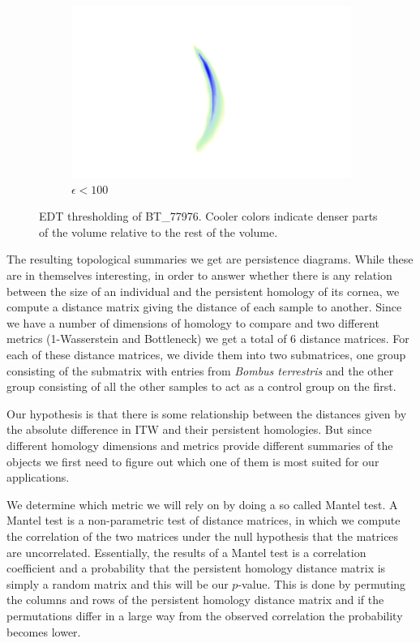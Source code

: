 \begin{figure}[ht]
\begin{subfigure}{.3 \linewidth}
  \includegraphics[scale=0.2]{eps100.png}
  \caption{$\epsilon < 100$}
  \end{subfigure}
  \caption{\label{thresh} EDT thresholding of BT\_77976. Cooler colors indicate denser parts of the volume relative to the rest of the volume.}
\end{figure}

The resulting topological summaries we get are persistence diagrams. While these are in themselves interesting, in order to answer whether there is any relation between the size of an individual and the persistent homology of its cornea, we compute a distance matrix giving the distance of each sample to another. Since we have a number of dimensions of homology to compare and two different metrics (1-Wasserstein and Bottleneck) we get a total of 6 distance matrices. For each of these distance matrices, we divide them into two submatrices, one group consisting of the submatrix with entries from \textit{Bombus terrestris} and the other group consisting of all the other samples to act as a control group on the first.

Our hypothesis is that there is some relationship between the distances given by the absolute difference in ITW and their persistent homologies. But since different homology dimensions and metrics provide different summaries of the objects we first need to figure out which one of them is most suited for our applications.

We determine which metric we will rely on by doing a so called Mantel test. A Mantel test is a non-parametric test of distance matrices, in which we compute the correlation of the two matrices under the null hypothesis that the matrices are uncorrelated. Essentially, the results of a Mantel test is a correlation coefficient and a probability that the persistent homology distance matrix is simply a random matrix and this will be our $p$-value. This is done by permuting the columns and rows of the persistent homology distance matrix and if the permutations differ in a large way from the observed correlation the probability becomes lower.

